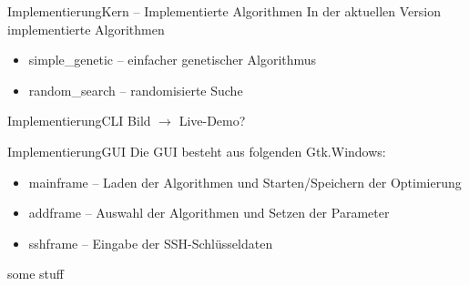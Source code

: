 \documentclass[ngerman,10pt,xcolor=colortbl,compress
]{beamer}
\begin{document}
	\begin{frame}{Implementierung}{Kern -- Implementierte Algorithmen}
	In der aktuellen Version implementierte Algorithmen
	\begin{itemize}
		\item simple\_genetic -- einfacher genetischer Algorithmus
		\item random\_search -- randomisierte Suche
	\end{itemize}
	\end{frame}
	
	\begin{frame}{Implementierung}{CLI}
	Bild $\rightarrow$ Live-Demo?
	\end{frame}

	\begin{frame}{Implementierung}{GUI}
	Die GUI besteht aus folgenden Gtk.Windows:
	\begin{itemize}
		\item mainframe -- Laden der Algorithmen und Starten/Speichern der Optimierung
		\item addframe -- Auswahl der Algorithmen und Setzen der Parameter
		\item sshframe -- Eingabe der SSH-Schlüsseldaten
	\end{itemize}
	\end{frame}
	
	\begin{frame}
	some stuff
%	
%	
%	
%	
%	
	\end{frame}
	
\end{document}
